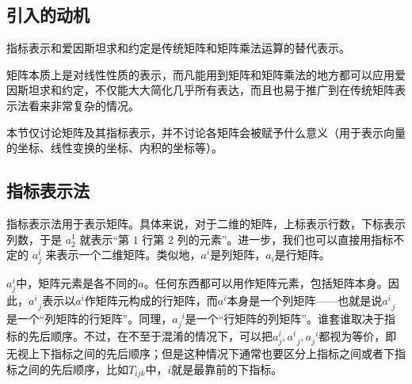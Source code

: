 
\begin{issues}
\end{issues}



\subsection{引入的动机}


指标表示和爱因斯坦求和约定是传统矩阵和矩阵乘法运算的替代表示。

矩阵本质上是对线性性质的表示，而凡能用到矩阵和矩阵乘法的地方都可以应用爱因斯坦求和约定，不仅能大大简化几乎所有表达，而且也易于推广到在传统矩阵表示法看来非常复杂的情况。

本节仅讨论矩阵及其指标表示，并不讨论各矩阵会被赋予什么意义（用于表示向量的坐标、线性变换的坐标、内积的坐标等）。





\subsection{指标表示法}


指标表示法用于表示矩阵。具体来说，对于二维的矩阵，上标表示行数，下标表示列数，于是 $a^1_2$ 就表示“第 $1$ 行第 $2$ 列的元素”。进一步，我们也可以直接用指标不定的 $a^i_j$ 来表示一个二维矩阵。类似地，$a^i$是列矩阵，$a_i$是行矩阵。

$a^i_j$中，矩阵元素是各不同的$a$。任何东西都可以用作矩阵元素，包括矩阵本身。因此，$a^{i}_{\phantom{1}j}$表示以$a^i$作矩阵元构成的行矩阵，而$a^i$本身是一个列矩阵——也就是说$a^i_{\phantom{1}j}$是一个“列矩阵的行矩阵”。同理，$a^{\phantom{1}i}_j$是一个“行矩阵的列矩阵”。谁套谁取决于指标的先后顺序。不过，在不至于混淆的情况下，可以把$a^i_j, a^i_{\phantom{1}j}, a^{\phantom{1}i}_j$都视为等价，即无视上下指标之间的先后顺序；但是这种情况下通常也要区分上指标之间或者下指标之间的先后顺序，比如$T_{ijk}$中，$i$就是最靠前的下指标。


